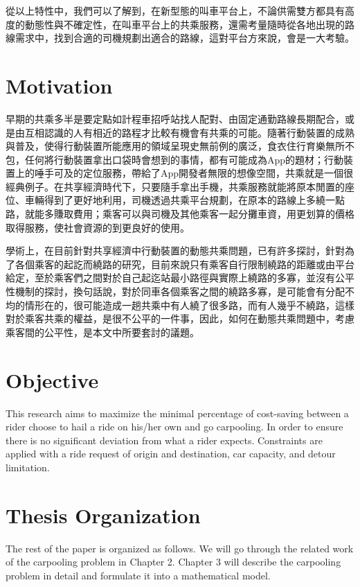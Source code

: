 從以上特性中，我們可以了解到，在新型態的叫車平台上，不論供需雙方都具有高度的動態性與不確定性，在叫車平台上的共乘服務，還需考量隨時從各地出現的路線需求中，找到合適的司機規劃出適合的路線，這對平台方來說，會是一大考驗。

\section{Motivation}

早期的共乘多半是要定點如計程車招呼站找人配對、由固定通勤路線長期配合，或是由互相認識的人有相近的路程\cite{chan_ridesharing_2012}才比較有機會有共乘的可能。隨著行動裝置的成熟與普及，使得行動裝置所能應用的領域呈現史無前例的廣泛，食衣住行育樂無所不包，任何將行動裝置拿出口袋時會想到的事情，都有可能成為App的題材；行動裝置上的唾手可及的定位服務，帶給了App開發者無限的想像空間，共乘就是一個很經典例子。在共享經濟時代下，只要隨手拿出手機，共乘服務就能將原本閒置的座位、車輛得到了更好地利用，司機透過共乘平台規劃，在原本的路線上多繞一點路，就能多賺取費用；乘客可以與司機及其他乘客一起分攤車資，用更划算的價格取得服務，使社會資源的到更良好的使用。

學術上，在目前針對共享經濟中行動裝置的動態共乘問題，已有許多探討，針對為了各個乘客的起訖而繞路的研究，目前來說只有乘客自行限制繞路的距離或由平台給定\cite{shen_dynamic_2016}，至於乘客們之間對於自己起迄站最小路徑與實際上繞路的多寡，並沒有公平性機制的探討，換句話說，對於同車各個乘客之間的繞路多寡，是可能會有分配不均的情形在的，很可能造成一趟共乘中有人繞了很多路，而有人幾乎不繞路，這樣對於乘客共乘的權益，是很不公平的一件事，因此，如何在動態共乘問題中，考慮乘客間的公平性，是本文中所要套討的議題。

\section{Objective}

This research aims to maximize the minimal percentage of cost-saving between a rider choose to hail a ride on his/her own and go carpooling. In order to ensure there is no significant deviation from what a rider expects. Constraints are applied with a ride request of origin and destination, car capacity, and detour limitation.

\section{Thesis Organization}

The rest of the paper is organized as follows. We will go through the related work of the carpooling problem in Chapter 2. Chapter 3 will describe the carpooling problem in detail and formulate it into a mathematical model.